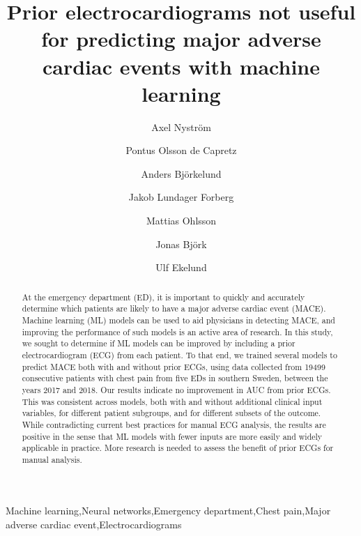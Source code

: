 \documentclass[preprint]{elsarticle}
\begin{document}
\begin{frontmatter}

\title{Prior electrocardiograms not useful for predicting major adverse cardiac events with machine learning}


\author[inst1]{Axel Nystr\"{o}m}
\author[inst2,inst3]{Pontus Olsson de Capretz}
\author[inst4]{Anders Bj\"{o}rkelund}
\author[inst3,inst5]{Jakob Lundager Forberg}
\author[inst4]{Mattias Ohlsson}
\author[inst1,inst6]{Jonas Bj\"{o}rk}
\author[inst2,inst3]{Ulf Ekelund}


            





\begin{abstract}
At the emergency department (ED), it is important to quickly and accurately determine which patients are likely to have a major adverse cardiac event (MACE). Machine learning (ML) models can be used to aid physicians in detecting MACE, and improving the performance of such models is an active area of research. In this study, we sought to determine if ML models can be improved by including a prior electrocardiogram (ECG) from each patient. To that end, we trained several models to predict MACE both with and without prior ECGs, using data collected from 19499 consecutive patients with chest pain from five EDs in southern Sweden, between the years 2017 and 2018. Our results indicate no improvement in AUC from prior ECGs. This was consistent across models, both with and without additional clinical input variables, for different patient subgroups, and for different subsets of the outcome. While contradicting current best practices for manual ECG analysis, the results are positive in the sense that ML models with fewer inputs  are more easily and widely applicable in practice. More research is needed to assess the benefit of prior ECGs for manual analysis.
\end{abstract}

\begin{keyword}
Machine learning\sep Neural networks\sep Emergency department\sep Chest pain\sep Major adverse cardiac event\sep Electrocardiograms
\end{keyword}

\end{frontmatter}
\end{document}
